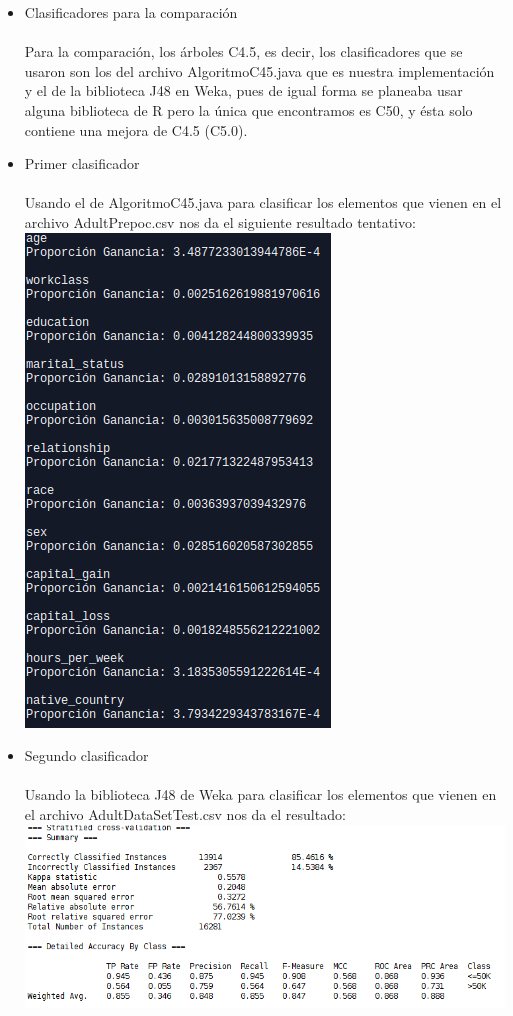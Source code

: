 \documentclass{article}
\begin{document}
\begin{itemize}
  \item Clasificadores para la comparación\\\\
  Para la comparación, los árboles C4.5, es decir, los clasificadores  que se usaron son los del archivo AlgoritmoC45.java que es nuestra implementación y el de la biblioteca J48 en Weka, pues de igual forma se planeaba usar alguna biblioteca de R pero la única que encontramos es C50, y ésta solo contiene una mejora de C4.5 (C5.0).
  \item Primer clasificador\\\\
  Usando el de AlgoritmoC45.java para clasificar los elementos que vienen en el archivo AdultPrepoc.csv nos da el siguiente resultado tentativo:\\
  \includegraphics[scale=0.6]{c45java}
  \item Segundo clasificador\\\\
  Usando la biblioteca J48 de Weka para clasificar los elementos que vienen en el archivo AdultDataSetTest.csv nos da el resultado:\\
  \includegraphics[scale=.9]{c45weka}\\

\end{itemize}
\end{document}
